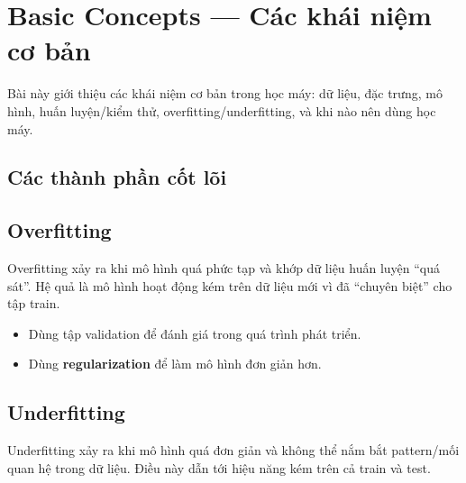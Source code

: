\section{Basic Concepts --- Các khái niệm cơ bản}

\begin{dongco}[title={target}]
Bài này giới thiệu các khái niệm cơ bản trong học máy: dữ liệu, đặc trưng, mô hình, huấn luyện/kiểm thử, overfitting/underfitting, và khi nào nên dùng học máy.
\end{dongco}

\subsection{Các thành phần cốt lõi}

\subsection{Overfitting}

\begin{dinhnghia}[title={Overfitting (Quá khớp)}]
Overfitting xảy ra khi mô hình quá phức tạp và khớp dữ liệu huấn luyện “quá sát”.
Hệ quả là mô hình hoạt động kém trên dữ liệu mới vì đã “chuyên biệt” cho tập train.
\end{dinhnghia}

\begin{phuongphap}[title={Cách giảm overfitting}]
\begin{itemize}
  \item Dùng tập validation để đánh giá trong quá trình phát triển.
  \item Dùng \textbf{regularization} để làm mô hình đơn giản hơn.
\end{itemize}
\end{phuongphap}

\subsection{Underfitting}

\begin{dinhnghia}[title={Underfitting (Thiếu khớp)}]
Underfitting xảy ra khi mô hình quá đơn giản và không thể nắm bắt pattern/mối quan hệ trong dữ liệu.
Điều này dẫn tới hiệu năng kém trên cả train và test.
\end{dinhnghia}


